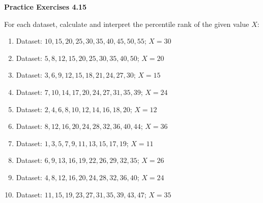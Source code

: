 \vspace{0.3ex}
\noindent\textbf{Practice Exercises 4.15}

\vspace{0.2ex}

For each dataset, calculate and interpret the percentile rank of the given value \(X\):  

\begin{enumerate}
    \item Dataset: \(10, 15, 20, 25, 30, 35, 40, 45, 50, 55\); \(X = 30\)  
    \item Dataset: \(5, 8, 12, 15, 20, 25, 30, 35, 40, 50\); \(X = 20\)  
    \item Dataset: \(3, 6, 9, 12, 15, 18, 21, 24, 27, 30\); \(X = 15\)  
    \item Dataset: \(7, 10, 14, 17, 20, 24, 27, 31, 35, 39\); \(X = 24\)  
    \item Dataset: \(2, 4, 6, 8, 10, 12, 14, 16, 18, 20\); \(X = 12\)  
    \item Dataset: \(8, 12, 16, 20, 24, 28, 32, 36, 40, 44\); \(X = 36\)  
    \item Dataset: \(1, 3, 5, 7, 9, 11, 13, 15, 17, 19\); \(X = 11\)  
    \item Dataset: \(6, 9, 13, 16, 19, 22, 26, 29, 32, 35\); \(X = 26\)  
    \item Dataset: \(4, 8, 12, 16, 20, 24, 28, 32, 36, 40\); \(X = 24\)  
    \item Dataset: \(11, 15, 19, 23, 27, 31, 35, 39, 43, 47\); \(X = 35\)  
\end{enumerate}

